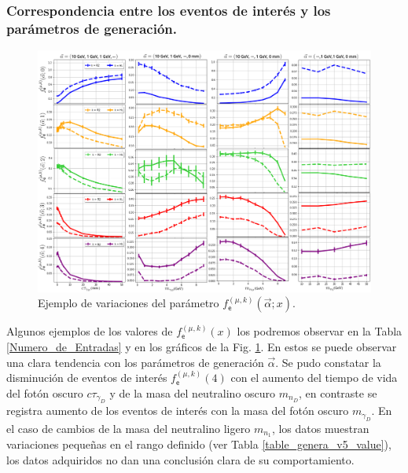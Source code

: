 \subsubsection{Correspondencia entre los eventos de interés y los parámetros de generación.}
\begin{figure}[!t]
\centering
\includegraphics[width=.9\textwidth]{Simulacion/imagenes/Comparacion_Distribucion_Entries0.png}
\caption{Ejemplo de variaciones del parámetro $f^{(\mu, k)}_\textsf{e} (\vec{\alpha}; x)$.}
\label{entradasALL}
\end{figure}

Algunos ejemplos de los valores de $f^{(\mu, k)}_\textsf{e} (x)$ los podremos observar en la Tabla \ref{Numero_de_Entradas} y en los gráficos de la Fig. \ref{entradasALL}. En estos se puede observar una clara tendencia con los parámetros de generación $\vec{\alpha}$. Se pudo constatar la disminución de eventos de interés $f^{(\mu, k)}_\textsf{e} (4)$ con el aumento del tiempo de vida del fotón oscuro $c\tau_{\gamma_D}$ y de la masa del neutralino oscuro $m_{n_D}$, en contraste se registra aumento de los eventos de interés con la masa del fotón oscuro $m_{\gamma_D}$. En el caso de cambios de la masa del neutralino ligero $m_{n_1}$, los datos muestran variaciones pequeñas en el rango definido (ver Tabla \ref{table_genera_v5_value}), los datos adquiridos no dan una conclusión clara de su comportamiento.



